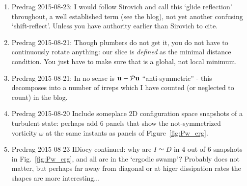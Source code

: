 \begin{description}
{\begin{enumerate}
\item Predrag 2015-08-23:
    I would follow Sirovich and call this
    `glide reflection' throughout, a well established term (see the blog),
    not yet another confusing `shift-reflect'. Unless you have authority
    earlier than Sirovich to cite.

\item Predrag 2015-08-21:
    Though plumbers do not get it, you do not have to continuously rotate anything:
    our slice is \emph{defined} as the minimal distance condition. You just
    have to make sure that is a global, not local minimum.

\item Predrag 2015-08-21:
    In no sense is $\mathbf u-\mathcal P\mathbf u$ ``anti-symmetric'' - this decomposes into
    a number of irreps which I have counted (or neglected to count) in the blog.

\item Predrag 2015-08-20
    Include someplace 2D configuration space snapshots of a turbulent state:
    perhaps add 6 panels that show the not-symmetrized vorticity $\omega$ at the same instants
    as panels of Figure~\ref{fig:Pw_erg}.

\item Predrag 2015-08-23
IDiocy continued: why are $I\simeq D$ in 4 out of 6 snapshots in Fig.~\ref{fig:Pw_erg},
and all are in the `ergodic swamp'?
Probably does not matter, but perhaps far away from diagonal or at higer
dissipation rates the shapes are more interesting...

\end{enumerate}
}
\end{description}
